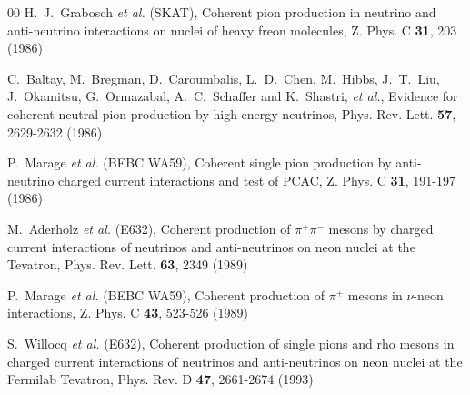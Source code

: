 \documentclass[aps,prl,twocolumn,superscriptaddress,nofootinbib]{revtex4-1}
\begin{document}
\begin{thebibliography}{00}
H.~J.~Grabosch \textit{et al.} (SKAT),
Coherent pion production in neutrino and anti-neutrino interactions on nuclei of heavy freon molecules,
Z. Phys. C \textbf{31}, 203 (1986)

C.~Baltay, M.~Bregman, D.~Caroumbalis, L.~D.~Chen, M.~Hibbs, J.~T.~Liu, J.~Okamitsu, G.~Ormazabal, A.~C.~Schaffer and K.~Shastri, \textit{et al.},
Evidence for coherent neutral pion production by high-energy neutrinos,
Phys. Rev. Lett. \textbf{57}, 2629-2632 (1986)

P.~Marage \textit{et al.} (BEBC WA59),
Coherent single pion production by anti-neutrino charged current interactions and test of {PCAC},
Z. Phys. C \textbf{31}, 191-197 (1986)

M.~Aderholz \textit{et al.} (E632),
Coherent production of $\pi^+ \pi^-$ mesons by charged current interactions of neutrinos and anti-neutrinos on neon nuclei at the Tevatron,
Phys. Rev. Lett. \textbf{63}, 2349 (1989)

P.~Marage \textit{et al.} (BEBC WA59),
Coherent production of $\pi^+$ mesons in $\nu$-neon interactions,
Z. Phys. C \textbf{43}, 523-526 (1989)

S.~Willocq \textit{et al.} (E632),
Coherent production of single pions and rho mesons in charged current interactions of neutrinos and anti-neutrinos on neon nuclei at the Fermilab Tevatron,
Phys. Rev. D \textbf{47}, 2661-2674 (1993)


\end{thebibliography}
\end{document}
